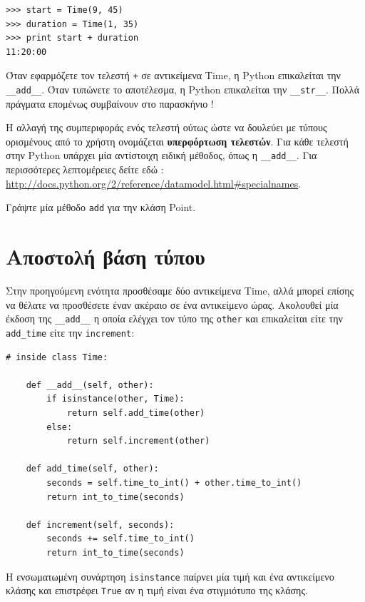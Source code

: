\documentclass[10pt]{book}
\begin{document}
\begin{verbatim}
>>> start = Time(9, 45)
>>> duration = Time(1, 35)
>>> print start + duration
11:20:00
\end{verbatim}
%
 Όταν εφαρμόζετε τον τελεστή  {\tt +}  σε αντικείμενα  Time,  η  Python  επικαλείται την  \verb"__add__".   Όταν τυπώνετε το αποτέλεσμα, η  Python  επικαλείται την  \verb"__str__".   Πολλά πράγματα επομένως συμβαίνουν στο παρασκήνιο !

 Η αλλαγή της συμπεριφοράς ενός τελεστή ούτως ώστε να δουλεύει με τύπους ορισμένους από το χρήστη ονομάζεται {\bf υπερφόρτωση τελεστών}.  Για κάθε τελεστή στην  Python  υπάρχει μία αντίστοιχη ειδική μέθοδος, όπως η  \verb"__add__".  Για περισσότερες λεπτομέρειες δείτε εδώ : \url{http://docs.python.org/2/reference/datamodel.html#specialnames}.

 
\begin{exercise}

Γράψτε μία μέθοδο  {\tt add}  για την κλάση  Point.
\end{exercise}


 
\section{Αποστολή βάση τύπου}

Στην προηγούμενη ενότητα προσθέσαμε δύο αντικείμενα  Time,  αλλά μπορεί επίσης να θέλατε να προσθέσετε έναν ακέραιο σε ένα αντικείμενο ώρας.  Ακολουθεί μία έκδοση της  
\verb"__add__"  η οποία ελέγχει τον τύπο της  {\tt other}  και επικαλείται είτε την  \verb"add_time"  είτε την  {\tt increment}:

\begin{verbatim}
# inside class Time:

    def __add__(self, other):
        if isinstance(other, Time):
            return self.add_time(other)
        else:
            return self.increment(other)

    def add_time(self, other):
        seconds = self.time_to_int() + other.time_to_int()
        return int_to_time(seconds)

    def increment(self, seconds):
        seconds += self.time_to_int()
        return int_to_time(seconds)
\end{verbatim}
%
 Η ενσωματωμένη συνάρτηση  {\tt isinstance}  παίρνει μία τιμή και ένα 
αντικείμενο κλάσης και επιστρέφει  {\tt True}  αν η τιμή είναι ένα στιγμιότυπο της 
κλάσης.
\end{document}
